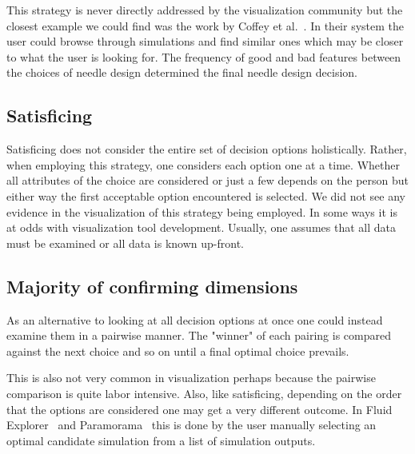 This strategy is never directly addressed by the visualization community
but the closest example we could find was the work by 
Coffey et al.~\citep{Coffey:2013}. In their system the user could browse
through simulations and find similar ones which may be closer to what
the user is looking for. The frequency of good and bad features between the
choices of needle design determined the final needle design decision.

\subsection{Satisficing}\label{satisficing}

Satisficing does not consider the entire set of decision options holistically.
Rather, when employing this strategy, one considers each option one at a time.
Whether all attributes of the choice are considered or just a few depends on
the person but either way the first acceptable option encountered is selected.
We did not see any evidence in the visualization  of this strategy being
employed. In some ways it is at odds with visualization tool development.
Usually, one assumes that all data must be examined or all data is known
up-front.

\subsection{Majority of confirming
dimensions}\label{majority-of-confirming-dimensions}

As an alternative to looking at all decision options at once one could 
instead examine them in a pairwise manner. The "winner" of each pairing is
compared against the next choice and so on until a final optimal choice
prevails.

This is also not very common in visualization perhaps because the pairwise
comparison is quite labor intensive. Also, like satisficing, depending on the
order that the options are considered one may get a very different outcome. In
Fluid Explorer~\cite{Bruckner:2010} and Paramorama~\citep{Pretorius:2011} this
is done by the user manually selecting an optimal candidate simulation from 
a list of simulation outputs.
 


